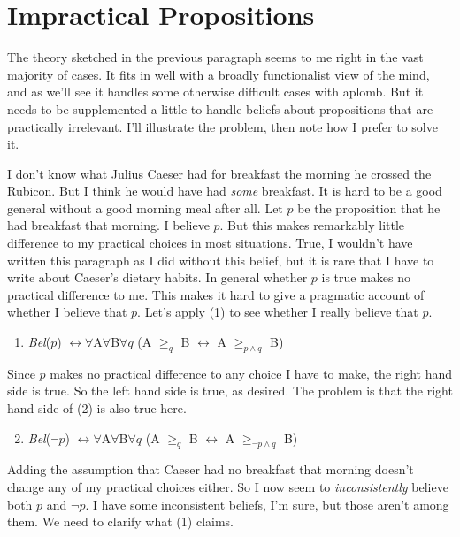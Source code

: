 \section{Impractical Propositions}

The theory sketched in the previous paragraph seems to me right in the vast majority of cases. It fits in well with a broadly functionalist view of the mind, and as we'll see it handles some otherwise difficult cases with aplomb. But it needs to be supplemented a little to handle beliefs about propositions that are practically irrelevant. I'll illustrate the problem, then note how I prefer to solve it.

I don't know what Julius Caeser had for breakfast the morning he crossed the Rubicon. But I think he would have had \textit{some} breakfast. It is hard to be a good general without a good morning meal after all. Let \(p\) be the proposition that he had breakfast that morning. I believe \(p\). But this makes remarkably little difference to my practical choices in most situations. True, I wouldn't have written this paragraph as I did without this belief, but it is rare that I have to write about Caeser's dietary habits. In general whether \(p\) is true makes no practical difference to me. This makes it hard to give a pragmatic account of whether I believe that \(p\). Let's apply (1) to see whether I really believe that \(p\).

\begin{enumerate}
\item \textit{Bel}(\(p\)) \(\leftrightarrow \forall\)A\(\forall\)B\(\forall q\) (A \(\geq _q\) B \(\leftrightarrow\) A \(\geq _{p \wedge q}\) B)
\end{enumerate}

\noindent Since \(p\) makes no practical difference to any choice I have to make, the right hand side is true. So the left hand side is true, as desired. The problem is that the right hand side of (2) is also true here.

\begin{enumerate}
\setcounter{enumi}{1}
\item \textit{Bel}(\(\neg p\)) \(\leftrightarrow \forall\)A\(\forall\)B\(\forall q\) (A \(\geq _q\) B \(\leftrightarrow\) A \(\geq _{\neg p \wedge q}\) B)
\end{enumerate}

\noindent Adding the assumption that Caeser had no breakfast that morning doesn't change any of my practical choices either. So I now seem to \textit{inconsistently} believe both \(p\) and \(\neg p\). I have some inconsistent beliefs, I'm sure, but those aren't among them. We need to clarify what (1) claims.

